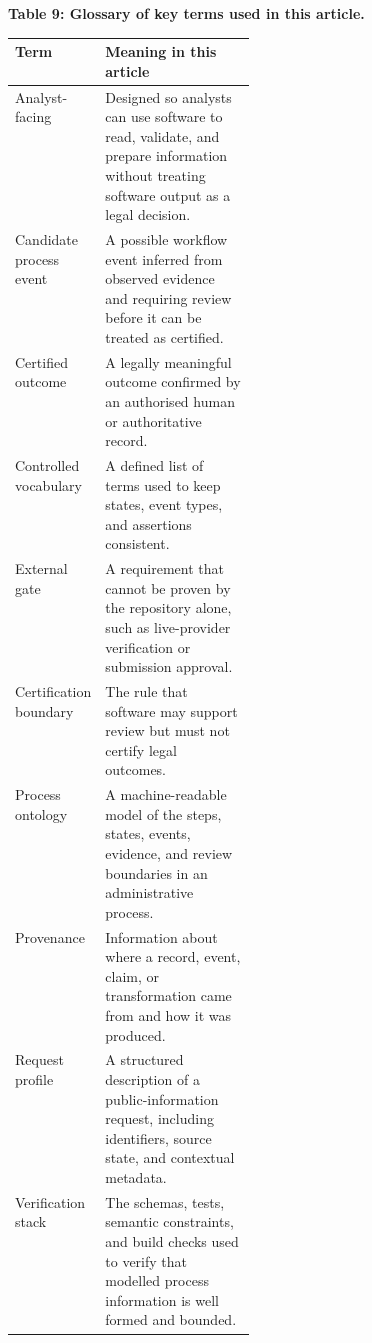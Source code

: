 \documentclass[
]{article}
\begin{document}
\begin{table}[H]
\small
\hypertarget{tab-glossary}{}
\begin{center}\small\textbf{Table 9: Glossary of key terms used in this article.}\end{center}
\begin{tabularx}{\linewidth}{>{\raggedright\arraybackslash}p{0.28\linewidth}X}
\toprule
Term & Meaning in this article \\
\midrule
Analyst-facing & Designed so analysts can use software to read, validate, and prepare information without treating software output as a legal decision. \\
Candidate process event & A possible workflow event inferred from observed evidence and requiring review before it can be treated as certified. \\
Certified outcome & A legally meaningful outcome confirmed by an authorised human or authoritative record. \\
Controlled vocabulary & A defined list of terms used to keep states, event types, and assertions consistent. \\
External gate & A requirement that cannot be proven by the repository alone, such as live-provider verification or submission approval. \\
Certification boundary & The rule that software may support review but must not certify legal outcomes. \\
Process ontology & A machine-readable model of the steps, states, events, evidence, and review boundaries in an administrative process. \\
Provenance & Information about where a record, event, claim, or transformation came from and how it was produced. \\
Request profile & A structured description of a public-information request, including identifiers, source state, and contextual metadata. \\
Verification stack & The schemas, tests, semantic constraints, and build checks used to verify that modelled process information is well formed and bounded. \\
\bottomrule
\end{tabularx}
\end{table}
\end{document}
